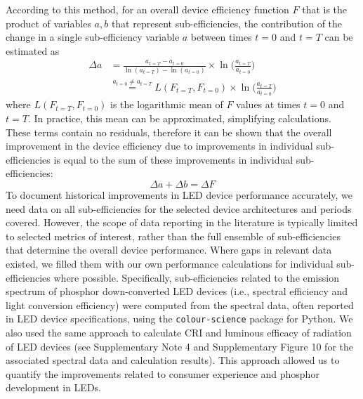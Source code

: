 \documentclass[parskip=full]{article}
\begin{document}
According to this method, for an overall device efficiency function $F$ that is the product of variables $a, b$ that represent sub-efficiencies, the contribution of the change in a single sub-efficiency variable $a$ between times $t=0$ and $t=T$ can be estimated as \cite{Ang2019}
%
\begin{align}
    \Delta a &= \frac{a_{t=T} - a_{t=0}}{\ln(a_{t=T}) - \ln(a_{t=0})} \times \ln \big ( \frac{a_{t=T}}{a_{t=0}} \big ) \\
    & \stackrel{a_{t=0} \neq a_{t=T}}{=} L(F_{t=T}, F_{t=0}) \times \ln \big ( \frac{a_{t=T}}{a_{t=0}} \big )
\end{align}
%
where $L(F_{t=T}, F_{t=0})$ is the logarithmic mean of $F$ values at times $t=0$ and $t=T$. In practice, this mean can be approximated, simplifying calculations. These terms contain no residuals, therefore it can be shown that the overall improvement in the device efficiency due to improvements in individual sub-efficiencies is equal to the sum of these improvements in individual sub-efficiencies: 
%
\begin{equation}
    \Delta a + \Delta b  = \Delta F
\end{equation}
%
To document historical improvements in LED device performance accurately, we need data on all sub-efficiencies for the selected device architectures and periods covered. However, the scope of data reporting in the literature is typically limited to selected metrics of interest, rather than the full ensemble of sub-efficiencies that determine the overall device performance. Where gaps in relevant data existed, we filled them with our own performance calculations for individual sub-efficiencies where possible. Specifically, sub-efficiencies related to the emission spectrum of phosphor down-converted LED devices (i.e., spectral efficiency and light conversion efficiency)  were computed from the spectral data, often reported in LED device specifications, using the \texttt{colour-science} package for Python. We also used the same approach to calculate CRI and luminous efficacy of radiation of LED devices (see Supplementary Note 4 and Supplementary Figure 10 for the associated spectral data and calculation results). This approach allowed us to quantify the improvements related to consumer experience and phosphor development in LEDs.
\end{document}
